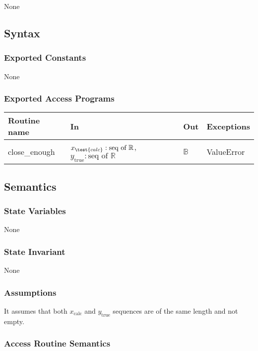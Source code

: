 \documentclass[12pt]{article}
\begin{document}
\begin{enumerate}[a)]
None

\subsection* {Syntax}

\subsubsection* {Exported Constants}

None

\subsubsection* {Exported Access Programs}

\begin{tabular}{| l | l | l | p{5cm} |}
  \hline
  \textbf{Routine name} & \textbf{In} & \textbf{Out} & \textbf{Exceptions}\\
  \hline
  close\_enough & $x_\test{calc}: \text{seq of }\mathbb{R}$, $y_\text{true}: \text{seq of } 
  \mathbb{R}$ & $\mathbb{B}$ & ValueError\\
  \hline
\end{tabular}

\subsection* {Semantics}

\subsubsection* {State Variables}

None

\subsubsection* {State Invariant}

None

\subsubsection* {Assumptions}

It assumes that both $x_\text{calc}$ and $y_\text{true}$ sequences are of the same length and 
not empty.

\subsubsection* {Access Routine Semantics}


\end{enumerate}
\end{document}
